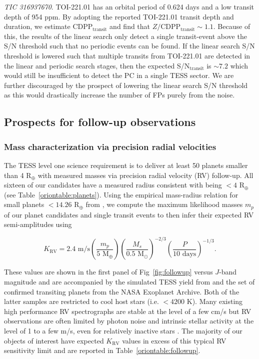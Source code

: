 \emph{TIC 316937670}. TOI-221.01 has an orbital period of 0.624 days and a low transit depth
of 954 ppm. By adopting the reported TOI-221.01 transit depth and duration, we estimate
CDPP$_{\text{transit}}$ and find that $Z/\text{CDPP}_{\text{transit}} \sim 1.1$. Because of this,
the results of the \pipeline{} linear search only detect
a single transit-event above the S/N threshold such that
no periodic events can be found. If the linear search S/N threshold is lowered
such that multiple transits from TOI-221.01 are detected in the linear and periodic search stages, then
the expected S/N$_{\text{transit}}$ is $\sim 7.2$ which would still be insufficient to detect the PC in
a single TESS sector. We are further discouraged by the prospect of lowering the linear search S/N
threshold as this would drastically increase the number of FPs purely from the noise. \\


\subsection{Prospects for follow-up observations}
\subsubsection{Mass characterization via precision radial velocities} \label{sect:rv}
The TESS level one science requirement is to deliver at least 50 planets smaller than 4
R$_{\oplus}$ with measured masses via precision radial velocity (RV) follow-up. All sixteen of our
candidates have a measured radius consistent with being $<4$ R$_{\oplus}$ (see Table~\ref{oriontable:planets}).
Using the empirical mass-radius relation for small planets $<14.26$ R$_{\oplus}$ from \cite{chen17},
we compute the maximum likelihood masses $m_p$ of our planet candidates and single transit events
to then infer their expected RV semi-amplitudes using  

\begin{equation}
  K_{\text{RV}} = 2.4 \text{ m/s} \left( \frac{m_p}{5 \text{ M}_{\oplus}} \right)
  \left( \frac{M_s}{0.5 \text{ M}_{\odot}} \right)^{-2/3} 
  \left( \frac{P}{10\text{ days}} \right)^{-1/3}.
\end{equation}

\noindent These values are shown in the first panel of Fig~\ref{fig:followup} versus $J$-band magnitude
and are accompanied by the simulated TESS yield from \cite{barclay18} and the set of
confirmed transiting planets from the NASA Exoplanet Archive.
Both of the latter samples are restricted to cool host stars (i.e. \teff{}
$<4200$ K). Many existing high performance RV spectrographs are stable at the level of a few cm/s but
RV observations are often limited by photon noise and intrinsic stellar activity at the level of 1 to a few
m/s, even for relatively inactive stars \citep{fischer16}. 
The majority of our objects of interest have expected $K_{\text{RV}}$ values in excess of this typical RV
sensitivity limit and are reported in Table~\ref{oriontable:followup}.  \\

